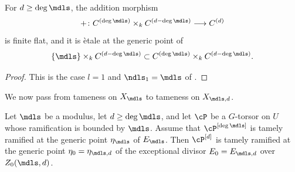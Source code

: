\begin{cor}\label{cor:etale_at_generic_point}
For $d\geq\deg\mdls$, the addition morphism
\[
+\colon C^{(\deg\mdls)}\times_k C^{(d-\deg\mdls)}\longrightarrow C^{(d)}
\]
is finite flat, and it is \`etale at the generic point of
\[
\{\mdls\}\times_k C^{(d-\deg\mdls)}
   \subset C^{(\deg\mdls)}\times_k C^{(d-\deg\mdls)}.
\]
\end{cor}
\begin{proof}
This is the case $l=1$ and $\ndls_1=\mdls$ of .
\end{proof}

We now pass from tameness on $X_{\mdls}$ to tameness on $X_{\mdls,d}$.

\begin{cor}\label{cor:tame-ramification-symmetric-product}
Let $\mdls$ be a modulus, let $d\geq\deg\mdls$, and let $\cP$ be a
$G$-torsor on $U$ whose ramification is bounded by $\mdls$. Assume that
$\cP^{[\deg\mdls]}$ is tamely ramified at the generic point
$\eta_{\mdls}$ of $E_{\mdls}$. Then $\cP^{[d]}$ is tamely ramified at
the generic point $\eta_0=\eta_{\mdls,d}$ of the exceptional divisor
$E_0=E_{\mdls,d}$ over $Z_0(\mdls,d)$.
\end{cor}
